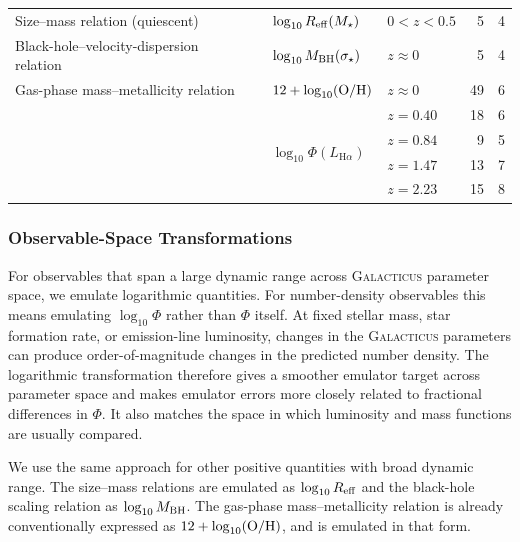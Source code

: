 \documentclass[twocolumn, apj, numberedappendix, iop]{openjournal}
\newcommand{\galacticus}{\textsc{Galacticus}\xspace}
\newcommand{\ha}{H$\alpha$}
\begin{document}
\begin{table}
\begin{tabular}{@{}p{}p{}p{}p{}rr@{}}
Size--mass relation (quiescent)
  &
  & \(\log_{10}R_{\rm eff}(M_\star)\)
  & \(0<z<0.5\) & 5 & 4 \\
\addlinespace[0.5em]

Black-hole--velocity-dispersion relation
  & \citet{2013ApJ...764..184M}
  & \(\log_{10}M_{\rm BH}(\sigma_\star)\)
  & \(z\approx0\) & 5 & 4 \\
\addlinespace[0.5em]

Gas-phase mass--metallicity relation
  & \citet{2019ApJ...877....6B}
  & \(12+\log_{10}({\rm O/H})\)
  & \(z\approx0\) & 49 & 6 \\
\addlinespace[0.5em]

\multirow{4}{0.28\textwidth}{\ha{} luminosity function}
  & \multirow{4}{0.17\textwidth}{\citet{2013MNRAS.428.1128S}}
  & \multirow{4}{0.17\textwidth}{\(\log_{10}\Phi(L_{\mathrm{H}\alpha})\)}
  & \(z=0.40\) & 18 & 6 \\
  & & & \(z=0.84\) & 9 & 5 \\
  & & & \(z=1.47\) & 13 & 7 \\
  & & & \(z=2.23\) & 15 & 8 \\
\bottomrule
\end{tabular}
\end{table}

\subsubsection{Observable-Space Transformations}
\label{sec:observable-space-transformations}

For observables that span a large dynamic range across \galacticus{} parameter
space, we emulate logarithmic quantities.  For number-density observables this
means emulating $\log_{10}\Phi$ rather than $\Phi$ itself.  At fixed stellar
mass, star formation rate, or emission-line luminosity, changes in the
\galacticus{} parameters can produce order-of-magnitude changes in the
predicted number density.  The logarithmic transformation therefore gives a smoother emulator target across parameter space and makes emulator errors more closely related to fractional differences in $\Phi$. It also matches the space in which luminosity and mass functions are usually compared.

We use the same approach for other positive quantities with broad dynamic
range.  The size--mass relations are emulated as $\log_{10}R_{\rm eff}$ and
the black-hole scaling relation as $\log_{10}M_{\rm BH}$.  The gas-phase
mass--metallicity relation is already conventionally expressed as
$12+\log_{10}({\rm O/H})$, and is emulated in that form.
\end{document}

